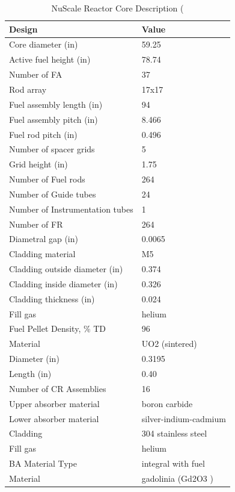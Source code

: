 \documentclass[10pt,a4paper]{article}
\begin{document}
\pagebreak
\begin{table} [htbp]
\begin{center}

\caption{NuScale Reactor Core Description (\cite{NuScale18}}
\label{Nutable}
\begin{tabular}{l     l}
\hline 
Design 		&Value \\ 
\hline 
Core diameter (in)			&59.25\\
Active fuel height (in)	&78.74\\

Number of FA 		&  37\\
Rod array   			&17x17\\
Fuel assembly length (in) &  94\\
Fuel assembly pitch (in)	&8.466\\
Fuel rod pitch (in)&0.496\\
Number of spacer grids&5\\
Grid height (in)&1.75\\
Number of Fuel rods&264\\
Number of Guide tubes&24\\
Number of Instrumentation tubes&1\\
\hline 
Number of FR&264\\
Diametral gap (in)&0.0065\\
Cladding material&M5\\
Cladding outside diameter (in)&0.374\\
Cladding inside diameter (in)&0.326\\
Cladding thickness (in)&0.024\\
Fill gas&helium\\
\hline 
Fuel Pellet Density, \% TD&96\\
Material&UO2 (sintered)\\
Diameter (in)&0.3195\\
Length (in) &0.40\\
\hline 
Number of CR Assemblies&16                              \\
Upper absorber material&boron carbide              \\
Lower absorber material&silver-indium-cadmium \\
Cladding&304 stainless steel      \\
Fill gas&helium                        \\
\hline 
BA Material Type&integral with fuel         \\
Material &gadolinia (Gd2O3 )      \\

\end{tabular}
\end{center}
\end{table}
\end{document}

